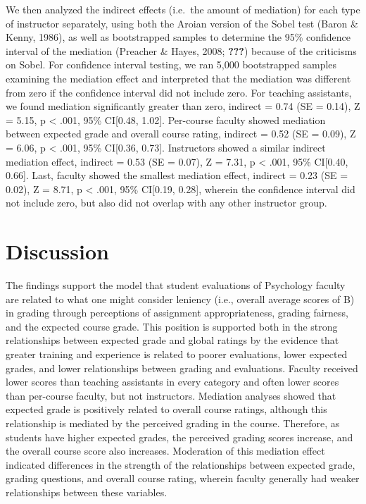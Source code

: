 \documentclass[man]{apa6}
\theoremstyle{definition}
\theoremstyle{definition}
\theoremstyle{definition}
\theoremstyle{remark}
\begin{document}
We then analyzed the indirect effects (i.e.~the amount of mediation) for
each type of instructor separately, using both the Aroian version of the
Sobel test (Baron \& Kenny, 1986), as well as bootstrapped samples to
determine the 95\% confidence interval of the mediation (Preacher \&
Hayes, 2008; {\textbf{???}}) because of the criticisms on Sobel. For
confidence interval testing, we ran 5,000 bootstrapped samples examining
the mediation effect and interpreted that the mediation was different
from zero if the confidence interval did not include zero. For teaching
assistants, we found mediation significantly greater than zero, indirect
= 0.74 (SE = 0.14), Z = 5.15, p \textless{} .001, 95\% CI{[}0.48,
1.02{]}. Per-course faculty showed mediation between expected grade and
overall course rating, indirect = 0.52 (SE = 0.09), Z = 6.06, p
\textless{} .001, 95\% CI{[}0.36, 0.73{]}. Instructors showed a similar
indirect mediation effect, indirect = 0.53 (SE = 0.07), Z = 7.31, p
\textless{} .001, 95\% CI{[}0.40, 0.66{]}. Last, faculty showed the
smallest mediation effect, indirect = 0.23 (SE = 0.02), Z = 8.71, p
\textless{} .001, 95\% CI{[}0.19, 0.28{]}, wherein the confidence
interval did not include zero, but also did not overlap with any other
instructor group.

\hypertarget{discussion}{%
\section{Discussion}\label{discussion}}

The findings support the model that student evaluations of Psychology
faculty are related to what one might consider leniency (i.e., overall
average scores of B) in grading through perceptions of assignment
appropriateness, grading fairness, and the expected course grade. This
position is supported both in the strong relationships between expected
grade and global ratings by the evidence that greater training and
experience is related to poorer evaluations, lower expected grades, and
lower relationships between grading and evaluations. Faculty received
lower scores than teaching assistants in every category and often lower
scores than per-course faculty, but not instructors. Mediation analyses
showed that expected grade is positively related to overall course
ratings, although this relationship is mediated by the perceived grading
in the course. Therefore, as students have higher expected grades, the
perceived grading scores increase, and the overall course score also
increases. Moderation of this mediation effect indicated differences in
the strength of the relationships between expected grade, grading
questions, and overall course rating, wherein faculty generally had
weaker relationships between these variables.
\end{document}
